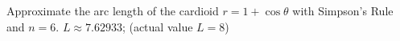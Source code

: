 {Approximate the arc length of the cardioid $r=1+\cos\theta$ with Simpson's Rule and $n=6.$
}
{$L\approx 7.62933$; (actual value $L=8$)
}

